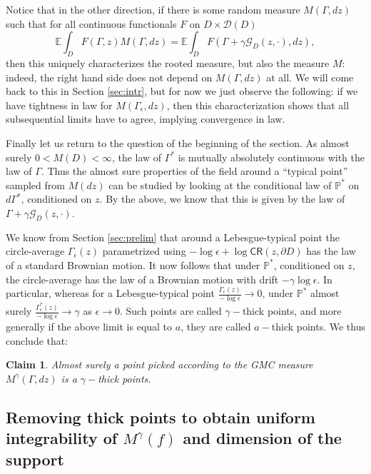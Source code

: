 \documentclass[11pt]{amsart}
\newtheorem{claim}[thm]{Claim}
\newcommand{\G}{\mathcal G}
\newcommand{\E}{\mathbb E}
\newcommand{\CR}{\mathsf{CR}}
\renewcommand{\P}{\mathbb P}
\renewcommand{\1}{\mathbf 1}
\newcommand{\eps}{\epsilon}
\begin{document}
Notice that in the other direction, if there is some random measure $M(\Gamma,dz)$ such that for all continuous functionals $F$ on $D\times \mathcal{D}(D)$
$$\E \int_D F(\Gamma, z) M(\Gamma, dz) = \E \int_D F(\Gamma + \gamma \G_D(z,\cdot),dz),$$
then this uniquely characterizes the rooted measure, but also the measure $M$: indeed, the right hand side does not depend on $M(\Gamma,dz)$ at all. We will come back to this in Section \ref{sec:intr}, but for now we just observe the following: if we have tightness in law for $M(\Gamma_\eps,dz)$, then this characterization shows that all subsequential limits have to agree, implying convergence in law. 

Finally let us return to the question of the beginning of the section. As almost surely $0 < M(D) < \infty$, the law of $\Gamma^*$ is mutually absolutely continuous with the law of $\Gamma$. Thus the almost sure properties of the field around a ``typical point'' sampled from $M(dz)$ can be studied by looking at the conditional law of $\P^*$ on $d\Gamma^*$, conditioned on $z$. By the above, we know that this is given by the law of $\Gamma + \gamma \G_D(z, \cdot)$. 

We know from Section \ref{sec:prelim} that around a Lebesgue-typical point the circle-average $\Gamma_\eps(z)$ parametrized using $-\log \eps + \log \CR(z,\partial D)$ has the law of a standard Brownian motion. It now follows that under $\P^*$, conditioned on $z$, the circle-average has the law of a Brownian motion with drift $- \gamma \log \eps$. In particular, whereas for a Lebesgue-typical point $\frac{\Gamma_\eps(z)}{- \log \eps} \to 0$, under $\P^*$ almost surely $\frac{\Gamma^*_\eps(z)}{- \log \eps} \to \gamma$ as $\eps \to 0$. Such points are called $\gamma-$thick points, and more generally if the above limit is equal to $a$, they are called $a-$thick points. We thus conclude that:

\begin{claim}
Almost surely a point picked according to the GMC measure $M^\gamma(\Gamma,dz)$ is a $\gamma-$thick points.
\end{claim}

\subsection{Removing thick points to obtain uniform integrability of $M^\gamma(f)$ and dimension of the support}\label{sec:thickpoints}
\end{document}
